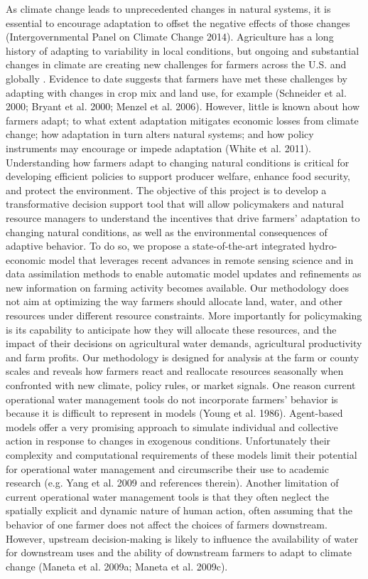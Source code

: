 \documentclass[review]{elsarticle}
\begin{document}
As climate change leads to unprecedented changes in natural systems, it is essential to encourage adaptation to offset the negative effects of those changes (Intergovernmental Panel on Climate Change 2014). Agriculture has a long history of adapting to variability in local conditions, but ongoing and substantial changes in climate are creating new challenges for farmers across the U.S. and globally \citep{McCarl2015, Rose2015}. Evidence to date suggests that farmers have met these challenges by adapting with changes in crop mix and land use, for example (Schneider et al. 2000; Bryant et al. 2000; Menzel et al. 2006). However, little is known about how farmers adapt; to what extent adaptation mitigates economic losses from climate change; how adaptation in turn alters natural systems; and how policy instruments may encourage or impede adaptation (White et al. 2011). 
Understanding how farmers adapt to changing natural conditions is critical for developing efficient policies to support producer welfare, enhance food security, and protect the environment. The objective of this project is to develop a transformative decision support tool that will allow policymakers and natural resource managers to understand the incentives that drive farmers’ adaptation to changing natural conditions, as well as the environmental consequences of adaptive behavior.  To do so, we propose a state-of-the-art integrated hydro-economic model that leverages recent advances in remote sensing science and in data assimilation methods to enable automatic model updates and refinements as new information on farming activity becomes available. Our methodology does not aim at optimizing the way farmers should allocate land, water, and other resources under different resource constraints. More importantly for policymaking is its capability to anticipate how they will allocate these resources, and the impact of their decisions on agricultural water demands, agricultural productivity and farm profits. Our methodology is designed for analysis at the farm or county scales and reveals how farmers react and reallocate resources seasonally when confronted with new climate, policy rules, or market signals. 
One reason current operational water management tools do not incorporate farmers’ behavior is because it is difficult to represent in models (Young et al. 1986). Agent-based models offer a very promising approach to simulate individual and collective action in response to changes in exogenous conditions. Unfortunately their complexity and computational requirements of these models limit their potential for operational water management and circumscribe their use to academic research (e.g. Yang et al. 2009 and references therein). Another limitation of current operational water management tools is that they often neglect the spatially explicit and dynamic nature of human action, often assuming that the behavior of one farmer does not affect the choices of farmers downstream. However, upstream decision-making is likely to influence the availability of water for downstream uses and the ability of downstream farmers to adapt to climate change (Maneta et al. 2009a; Maneta et al. 2009c).
\end{document}
